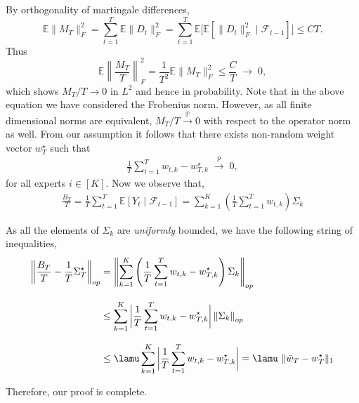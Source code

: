 \documentclass[11pt,letterpaper]{article}
\newcommand{\Prob}{\mathbb{P}}
\newcommand{\wstar}{w^\star}
\newcommand{\inprob}{\; \stackrel{p}{\rightarrow} \; }
\newcommand{\BT}{{\Sigma^\star_T}}
\theoremstyle{plain}
\theoremstyle{definition}  %
\begin{document}
\noindent By orthogonality of martingale differences,
\begin{equation*}
  \mathbb{E}\|M_T\|_F^2
  = \sum_{t=1}^T \mathbb{E}\|D_t\|_F^2
  = \sum_{t=1}^T \mathbb{E}\big[\mathbb{E}[\|D_t\|_F^2 \mid \mathcal{F}_{t-1}]\big]
  \le CT.
\end{equation*}
\noindent Thus
\begin{equation}\label{eqn:MT-bdd}
  \mathbb{E}\left\|\frac{M_T}{T}\right\|_F^2
  = \frac{1}{T^2} \mathbb{E}\|M_T\|_F^2
  \le \frac{C}{T} \;\to\; 0,
\end{equation}
which shows $M_T/T \to 0$ in $L^2$ and hence in probability. Note that in the above equation we have considered the Frobenius norm. However, as all finite dimensional norms are equivalent, $M_T/T \xrightarrow{\Prob} 0$ with respect to the operator norm as well.
From our assumption it follows that there exists non-random weight vector $w^\star_T$ such that
\begin{align}
    \frac{1}{T}\sum_{t = 1}^T w_{t,k}-\wstar_{T,k}  \inprob 0,
\end{align}
for all experts $i \in [K]$. Now we observe that,
\begin{align*}
    \frac{B_T}{T} = \frac{1}{T}\sum_{t=1}^T \mathbb{E}[Y_t\mid \mathcal{F}_{t-1}] = \sum^K_{k=1} \left(\frac{1}{T}\sum_{t=1}^Tw_{t,k} \right) \Sigma_k
\end{align*}

\noindent As all the elements of $\Sigma_k$ are \emph{uniformly} bounded, we have the following string of inequalities,
\begin{align}\label{eqn:BT-bdd}
\notag
    \left\|\frac{B_T}{T} -\frac{1}{T} \BT  \right\|_{op}
    &=  \left\| \sum^K_{k=1} \left(\frac{1}{T}\sum_{t=1}^Tw_{t,k} - \wstar_{T,k}\right) \Sigma_k \right\|_{op} \\[8pt] \notag
    & \leq \sum^K_{k=1}  \bigg| \frac{1}{T}\sum_{t=1}^Tw_{t,k} - \wstar_{T,k}  \bigg| \left\| \Sigma_k  \right\|_{op} \\[8pt]
    & \leq \lamu  \sum^K_{k=1} \bigg|\frac{1}{T}\sum_{t=1}^Tw_{t,k} - \wstar_{T,k} \bigg| 
     = \lamu \  \| \bar{w}_{T} - w^\star_T \|_1
\end{align}

\noindent Therefore, our proof is complete.
\end{document}
